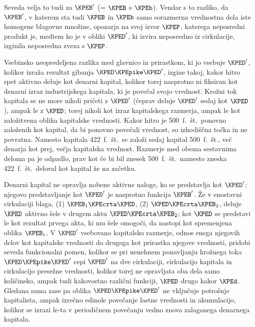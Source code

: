 \documentclass[kapital_02.tex]{subfiles}
\begin{document}
Seveda velja to tudi za \(\KPEB'\) (= \(\KPEB + \KPEb\)). Vendar s to razliko, da \(\KPEB'\), v katerem sta tudi \(\KPEB\) in \(\KPEb\) samo sorazmerna vrednostna dela iste homogene blagovne množine, opozarja na svoj izvor \(\KPEP\), katerega neposredni produkt je, medtem ko je v obliki \(\KPED'\), ki izvira neposredno iz cirkulacije, izginila neposredna zveza s \(\KPEP\).

Vsebinsko neopredeljena razlika med glavnico in prirastkom, ki jo vsebuje \(\KPED'\), kolikor izraža rezultat gibanja \(\KPED\KPEpike\KPED'\), izgine takoj, kakor hitro spet aktivno deluje kot denarni kapital, kolikor torej nasprotno ni fiksiran kot denarni izraz industrijskega kapitala, ki je povečal svojo vrednost. Krožni tok kapitala se ne more nikoli pričeti z \(\KPED'\) (čeprav deluje \(\KPED'\) sedaj kot \(\KPED\)), ampak le z \(\KPED\); torej nikoli kot izraz kapitalskega razmerja, ampak le kot založitvena oblika kapitalske vrednosti. Kakor hitro je 500\ f.\ št.\ ponovno založenih kot kapital, da bi ponovno povečali vrednost, so izhodiščna točka in ne povratna. Namesto kapitala 422\ f.\ št.\ se založi sedaj kapital 500\ f.\ št., več denarja kot prej, večja kapitalska vrednost. Razmerje med obema sestavnima deloma pa je \KPEstran odpadlo, prav kot če bi bil znesek 500\ f.\ št.\ namesto zneska 422\ f.\ št.\ deloval kot kapital že na začetku.

Denarni kapital ne opravlja nobene aktivne naloge, ko se predstavlja kot \(\KPED'\); njegovo predstavljanje kot \(\KPED'\) je nasprotno funkcija \(\KPEB'\). Že v enostavni cirkulaciji blaga, (1) \(\KPEB_1\KPEcrta\KPED\), (2) \(\KPED\KPEcrta\KPEB_2\), deluje \(\KPED\) aktivno šele v drugem aktu \(\KPED\KPEcrta\KPEB_2\); kot \(\KPED\) se predstavi le kot rezultat prvega akta, ki mu šele omogoči, da nastopi kot spremenjena oblika \(\KPEB_1\). V \(\KPED'\) vsebovano kapitalsko razmerje, odnos enega njegovih delov kot kapitalske vrednosti do drugega kot prirastka njegove vrednosti, pridobi seveda funkcionalni pomen, kolikor se pri nenehnem ponavljanju krožnega toka \(\KPED\KPEpike\KPED'\) cepi \(\KPED'\) na dve cirkulaciji, cirkulacijo kapitala in cirkulacijo presežne vrednosti, kolikor torej ne opravljata oba dela samo količinsko, ampak tudi kakovostno različni funkciji, \(\KPED\) drugo kakor \(\KPEd\). Gledana sama zase pa oblika \(\KPED\KPEpike\KPED'\) ne vključuje potrošnje kapitalista, ampak izrečno edinole povečanje lastne vrednosti in akumulacijo, kolikor se izrazi le-ta v periodičnem povečanju vedno znova zalaganega denarnega kapitala.
\end{document}
